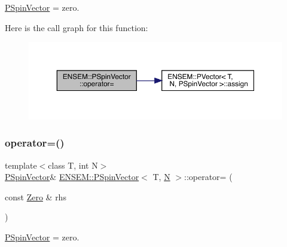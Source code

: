 \mbox{\hyperlink{classENSEM_1_1PSpinVector}{P\+Spin\+Vector}} = zero. 

Here is the call graph for this function\+:
\nopagebreak
\begin{figure}[H]
\begin{center}
\leavevmode
\includegraphics[width=350pt]{d0/dce/classENSEM_1_1PSpinVector_aff99857da5f6f68093f04c9df5355e84_cgraph}
\end{center}
\end{figure}
\mbox{\label{classENSEM_1_1PSpinVector_aff99857da5f6f68093f04c9df5355e84}} 
\subsubsection{\texorpdfstring{operator=()}{operator=()}\hspace{0.1cm}{\footnotesize\ttfamily [3/6]}}
{\footnotesize\ttfamily template$<$class T, int N$>$ \\
\mbox{\hyperlink{classENSEM_1_1PSpinVector}{P\+Spin\+Vector}}\& \mbox{\hyperlink{classENSEM_1_1PSpinVector}{E\+N\+S\+E\+M\+::\+P\+Spin\+Vector}}$<$ T, \mbox{\hyperlink{adat__devel_2lib_2hadron_2operator__name__util_8cc_a7722c8ecbb62d99aee7ce68b1752f337}{N}} $>$\+::operator= (\begin{DoxyParamCaption}\item[{const \mbox{\hyperlink{structENSEM_1_1Zero}{Zero}} \&}]{rhs }\end{DoxyParamCaption})\hspace{0.3cm}{\ttfamily [inline]}}



\mbox{\hyperlink{classENSEM_1_1PSpinVector}{P\+Spin\+Vector}} = zero. 

